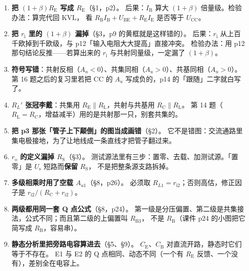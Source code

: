 \documentclass[11pt]{ctexart}
\begin{document}
\begin{enumerate}

\item \textbf{把 $(1+\beta)R_{\mathrm{E}}$ 写成 $R_{\mathrm{E}}$}（§1，p2）。
后果：$I_{\mathrm{B}}$ 算大 $(1+\beta)$ 倍量级。检验办法：算完代回 KVL，
看 $R_{\mathrm{B}}I_{\mathrm{B}}+U_{\mathrm{BE}}+R_{\mathrm{E}}I_{\mathrm{E}}$ 是否等于 $U_{\mathrm{CC}}$。

\item \textbf{把 $r_{\mathrm{i}}$ 里的 $(1+\beta)$ 漏掉}（§3，p9 的黄框就是这样错的）。
后果：$r_{\mathrm{i}}$ 从上百千欧掉到千欧级，与 p12「输入电阻大大提高」直接冲突。
检验办法：用 p12 那句结论反推——若算出来的 $r_{\mathrm{i}}$ 与共射同量级，一定漏了 $(1+\beta)$。

\item \textbf{符号写错}：共射反相（$A_u<0$）、共集同相（$A_u>0$）、共基同相（$A_u>0$）。
第 16 题之后的复习里若把 CC 的 $A_u$ 写成负的，p14 的「跟随」二字就白写了。

\item \textbf{$R_L'$ 张冠李戴}：共集用 $R_{\mathrm{E}}\parallel R_{\mathrm{L}}$，共射与共基用 $R_{\mathrm{C}}\parallel R_{\mathrm{L}}$。
第 14 题（$R_{\mathrm{L}}=R_{\mathrm{C}}$，增益减半）用的是共射那一只，别套共集的。

\item \textbf{把 p3 那张「管子上下颠倒」的图当成画错}（§2）。
它不是错图：交流通路里集电极接地，为了让地线成一条直线才把管子翻过来。

\item \textbf{$r_{\mathrm{o}}$ 的定义漏掉 $R_{\mathrm{S}}$}（§3）。
测试源法里有三步：置零、去载、加测试源。「置零」是 $\dot U_{\mathrm{s}}$ 短路而\textbf{保留} $R_{\mathrm{S}}$，
不是把整条源支路拆掉。

\item \textbf{多级相乘时用了空载 $A_{u1}$}（§8，p26）。
必须取 $R_{L1}=r_{\mathrm{i}2}$；否则高估，修正因子是 $r_{\mathrm{i}2}/(R_{\mathrm{C}}+r_{\mathrm{i}2})$。

\item \textbf{两级都用同一套 Q 点公式}（§8，p24）。
第一级是分压偏置、第二级是共集接法，公式不同；而且第二级的上偏置叫 $R_{\mathrm{B3}}$，
不是 $R_{\mathrm{B}}$（课件 p24 的小图把它简写成 $R_{\mathrm{B}}$，容易串）。

\item \textbf{静态分析里把旁路电容算进去}（§5、§9）。
$C_{\mathrm{E}}$、$C_{\mathrm{B}}$ 对直流开路，静态时它们等于不存在。
E1 与 E2 的 Q 点相同、动态不同（一个有 $R_{\mathrm{E}}$ 反馈、一个没有），差别全在电容上。


\end{enumerate}
\end{document}
